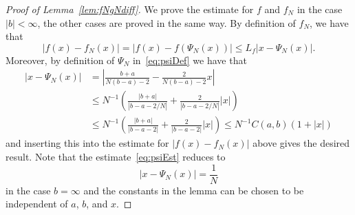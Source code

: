 \documentclass[10pt,a4paper]{amsart}
\begin{document}
\begin{proof}[Proof of Lemma~\ref{lem:fNgNdiff}]
We prove the estimate for $f$ and $f_{N}$ in the case $|b|<\infty$, the other cases are proved in the same way. By definition of $f_{N}$, we have that
\begin{equation*}
|f(x) - f_{N}(x)| = |f(x)-f(\Psi_{N}(x))| \leq L_{f} |x - \Psi_{N}(x)|.
\end{equation*}
Moreover, by definition of $\Psi_{N}$ in~\eqref{eq:psiDef} we have that
\begin{equation}\label{eq:psiEst}
  \begin{split}
    \left| x - \Psi_{N}(x) \right| &= \left| \frac{b + a}{N (b-a) - 2} - \frac{2}{N (b-a) - 2} x\right| \\ &\leq N^{-1} \left( \frac{|b+a|}{|b-a-2/N|} + \frac{2}{|b-a-2/N|} |x| \right) \\
    &\leq N^{-1} \left( \frac{|b+a|}{|b-a-2|} + \frac{2}{|b-a-2|} |x| \right) \leq N^{-1} C(a,b) (1 + |x|)
  \end{split}
\end{equation}
and inserting this into the estimate for $|f(x) - f_{N}(x)|$ above gives the desired result. Note that the estimate~\eqref{eq:psiEst} reduces to
\begin{equation*}
\left| x - \Psi_{N}(x) \right| = \frac{1}{N}
\end{equation*}
in the case $b = \infty$ and the constants in the lemma can be chosen to be independent of $a$, $b$, and $x$.
\end{proof}
\end{document}
